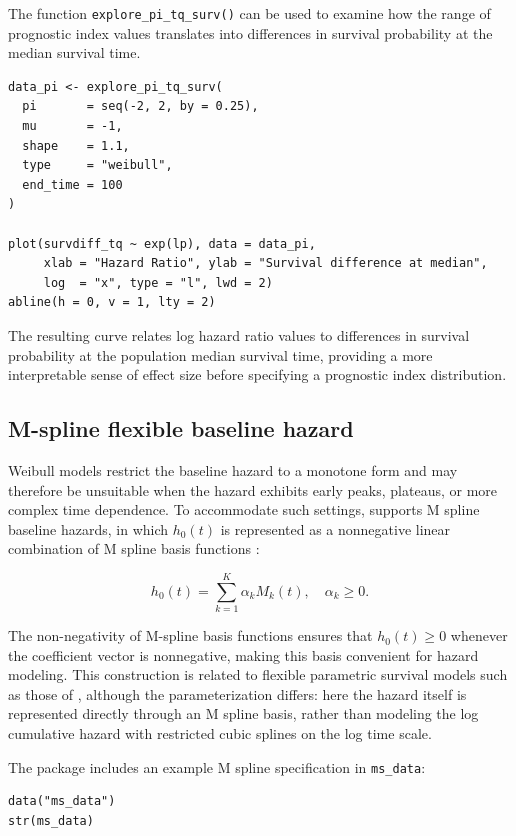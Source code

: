 The function \texttt{explore\_pi\_tq\_surv()} can be used to examine how the range of prognostic index values translates into differences in survival probability at the median survival time.

\begin{verbatim}
data_pi <- explore_pi_tq_surv(
  pi       = seq(-2, 2, by = 0.25),
  mu       = -1,
  shape    = 1.1,
  type     = "weibull",
  end_time = 100
)

plot(survdiff_tq ~ exp(lp), data = data_pi,
     xlab = "Hazard Ratio", ylab = "Survival difference at median",
     log  = "x", type = "l", lwd = 2)
abline(h = 0, v = 1, lty = 2)
\end{verbatim}

The resulting curve relates log hazard ratio values to differences in survival probability at the population median survival time, providing a more interpretable sense of effect size before specifying a prognostic index distribution.

\subsection{M-spline flexible baseline hazard}\label{m-spline-flexible-baseline-hazard}

Weibull models restrict the baseline hazard to a monotone form and may therefore be unsuitable when the hazard exhibits early peaks, plateaus, or more complex time dependence. To accommodate such settings,  supports M spline baseline hazards, in which
\(h_0(t)\) is represented as a nonnegative linear combination of M spline basis functions \citep{ramsay1988}:

\[h_0(t) = \sum_{k=1}^{K} \alpha_k M_k(t), \quad \alpha_k \geq 0.\]

The non-negativity of M-spline basis functions ensures that \(h_0(t) \geq 0\) whenever the coefficient vector is nonnegative, making this basis convenient for hazard modeling. This construction is related to flexible parametric survival models such as those of \citet{royston2002}, although the parameterization differs: here the hazard itself is represented directly through an M spline basis, rather than modeling the log cumulative hazard with restricted cubic splines on the log time scale.

The package includes an example M spline specification in \texttt{ms\_data}:

\begin{verbatim}
data("ms_data")
str(ms_data)
\end{verbatim}

